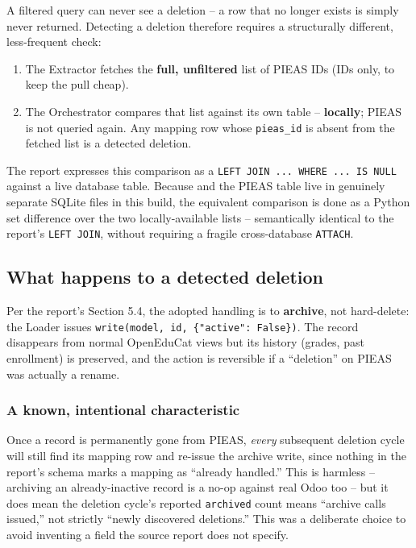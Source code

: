 \documentclass[11pt,a4paper]{article}
\newcommand{\ttu}[1]{\texttt{\detokenize{#1}}}
\begin{document}
A filtered \ttu{last_updated} query can never see a deletion -- a row that no longer exists is
simply never returned. Detecting a deletion therefore requires a structurally different,
less-frequent check:

\begin{enumerate}[leftmargin=1.4em]
    \item The Extractor fetches the \textbf{full, unfiltered} list of PIEAS IDs (IDs only, to
          keep the pull cheap).
    \item The Orchestrator compares that list against its own \ttu{sync_mapping} table --
          \textbf{locally}; PIEAS is not queried again. Any mapping row whose \texttt{pieas\_id}
          is absent from the fetched list is a detected deletion.
\end{enumerate}

The report expresses this comparison as a \texttt{LEFT JOIN ... WHERE ... IS NULL} against a
live database table. Because \ttu{sync_mapping} and the PIEAS table live in genuinely separate
SQLite files in this build, the equivalent comparison is done as a Python set difference over
the two locally-available lists -- semantically identical to the report's \texttt{LEFT JOIN},
without requiring a fragile cross-database \texttt{ATTACH}.

\subsection{What happens to a detected deletion}

Per the report's Section 5.4, the adopted handling is to \textbf{archive}, not hard-delete: the
Loader issues \texttt{write(model, id, \{"active": False\})}. The record disappears from normal
OpenEduCat views but its history (grades, past enrollment) is preserved, and the action is
reversible if a ``deletion'' on PIEAS was actually a rename.

\subsubsection*{A known, intentional characteristic}

Once a record is permanently gone from PIEAS, \emph{every} subsequent deletion cycle will still
find its mapping row and re-issue the archive write, since nothing in the report's schema marks
a mapping as ``already handled.'' This is harmless -- archiving an already-inactive record is a
no-op against real Odoo too -- but it does mean the deletion cycle's reported \texttt{archived}
count means ``archive calls issued,'' not strictly ``newly discovered deletions.'' This was a
deliberate choice to avoid inventing a field the source report does not specify.
\end{document}
